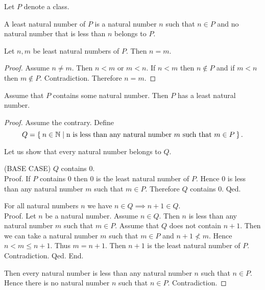 \documentclass[../../arithmetic.tex]{subfiles}
\begin{document}
  \begin{forthel}
    Let $P$ denote a class.

    \begin{definition}
      A least natural number of $P$ is a natural number $n$ such that $n \in P$ and no natural number that is less than $n$ belongs to $P$.
    \end{definition}

    \begin{lemma}
      Let $n,m$ be least natural numbers of $P$.
      Then $n = m$.
    \end{lemma}
    \begin{proof}
      Assume $n \neq m$.
      Then $n < m$ or $m < n$.
      If $n < m$ then $n \notin P$ and if $m < n$ then $m \notin P$.
      Contradiction.
      Therefore $n = m$.
    \end{proof}


    \begin{theorem}\label{Arithmetic_02_05_124228}
      Assume that $P$ contains some natural number.
      Then $P$ has a least natural number.
    \end{theorem}
    \begin{proof}
      Assume the contrary.
      Define \[ Q = \Set{n \in \mathbb{N} | \text{n is less than any natural number $m$ such that $m \in P$}}. \]

      Let us show that every natural number belongs to $Q$.

        (BASE CASE) $Q$ contains $0$. \\
        Proof.
          If $P$ contains $0$ then $0$ is the least natural number of $P$.
          Hence $0$ is less than any natural number $m$ such that $m \in P$.
          Therefore $Q$ contains $0$.
        Qed.

        For all natural numbers $n$ we have $n \in Q \implies n + 1 \in Q$. \\
        Proof.
          Let $n$ be a natural number.
          Assume $n \in Q$.
          Then $n$ is less than any natural number $m$ such that $m \in P$.
          Assume that $Q$ does not contain $n + 1$.
          Then we can take a natural number $m$ such that $m \in P$ and $n + 1 \nless m$.
          Hence $n < m \leq n + 1$.
          Thus $m = n + 1$.
          Then $n + 1$ is the least natural number of $P$.
          Contradiction.
        Qed.
      End.

      Then every natural number is less than any natural number $n$ such that $n \in P$.
      Hence there is no natural number $n$ such that $n \in P$.
      Contradiction.
    \end{proof}
  \end{forthel}
\end{document}
